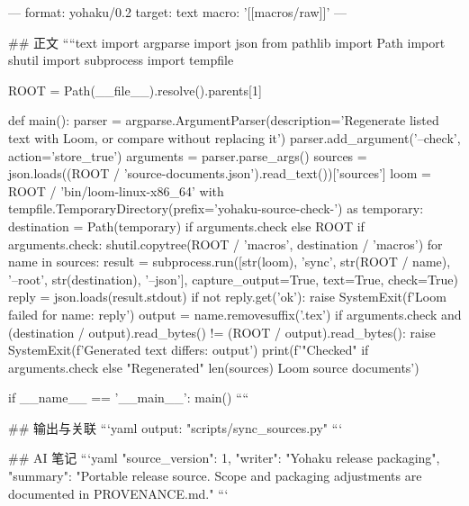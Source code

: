 ---
format: yohaku/0.2
target: text
macro: '[[macros/raw]]'
---

## 正文
````text
import argparse
import json
from pathlib import Path
import shutil
import subprocess
import tempfile


ROOT = Path(__file__).resolve().parents[1]


def main():
    parser = argparse.ArgumentParser(description='Regenerate listed text with Loom, or compare without replacing it')
    parser.add_argument('--check', action='store_true')
    arguments = parser.parse_args()
    sources = json.loads((ROOT / 'source-documents.json').read_text())['sources']
    loom = ROOT / 'bin/loom-linux-x86_64'
    with tempfile.TemporaryDirectory(prefix='yohaku-source-check-') as temporary:
        destination = Path(temporary) if arguments.check else ROOT
        if arguments.check:
            shutil.copytree(ROOT / 'macros', destination / 'macros')
        for name in sources:
            result = subprocess.run([str(loom), 'sync', str(ROOT / name), '--root', str(destination), '--json'],
                                    capture_output=True, text=True, check=True)
            reply = json.loads(result.stdout)
            if not reply.get('ok'):
                raise SystemExit(f'Loom failed for {name}: {reply}')
            output = name.removesuffix('.tex')
            if arguments.check and (destination / output).read_bytes() != (ROOT / output).read_bytes():
                raise SystemExit(f'Generated text differs: {output}')
    print(f'{"Checked" if arguments.check else "Regenerated"} {len(sources)} Loom source documents')


if __name__ == '__main__':
    main()
````

## 输出与关联
```yaml
output: "scripts/sync_sources.py"
```

## AI 笔记
```yaml
{"source_version": 1, "writer": "Yohaku release packaging", "summary": "Portable release source. Scope and packaging adjustments are documented in PROVENANCE.md."}
```
